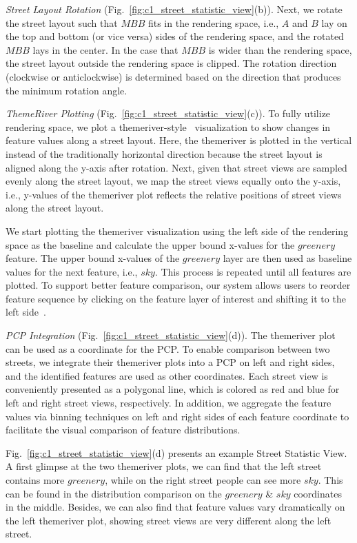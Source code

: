 \noindent
\textit{Street Layout Rotation} (Fig.~\ref{fig:c1_street_statistic_view}(b)).
Next, we rotate the street layout such that $MBB$ fits in the rendering space, i.e., $A$ and $B$ lay on the top and bottom (or vice versa) sides of the rendering space, and the rotated $MBB$ lays in the center.
In the case that $MBB$ is wider than the rendering space, the street layout outside the rendering space is clipped.
The rotation direction (clockwise or anticlockwise) is determined based on the direction that produces the minimum rotation angle.

\noindent
\textit{ThemeRiver Plotting} (Fig.~\ref{fig:c1_street_statistic_view}(c)).
To fully utilize rendering space, we plot a themeriver-style~\cite{havre2002themeriver} visualization to show changes in feature values along a street layout.
Here, the themeriver is plotted in the vertical instead of the traditionally horizontal direction because the street layout is aligned along the y-axis after rotation.
Next, given that street views are sampled evenly along the street layout, we map the street views equally onto the y-axis, i.e., y-values of the themeriver plot reflects the relative positions of street views along the street layout.

We start plotting the themeriver visualization using the left side of the rendering space as the baseline and calculate the upper bound x-values for the $greenery$ feature.
The upper bound x-values of the $greenery$ layer are then used as baseline values for the next feature, i.e., $sky$.
This process is repeated until all features are plotted.
To support better feature comparison, our system allows users to reorder feature sequence by clicking on the feature layer of interest and shifting it to the left side~\cite{byron2008stacked}.

\noindent
\textit{PCP Integration} (Fig.~\ref{fig:c1_street_statistic_view}(d)).
The themeriver plot can be used as a coordinate for the PCP.
To enable comparison between two streets, we integrate their themeriver plots into a PCP on left and right sides, and the identified features are used as other coordinates.
Each street view is conveniently presented as a polygonal line, which is colored as red and blue for left and right street views, respectively.
In addition, we aggregate the feature values via binning techniques on left and right sides of each feature coordinate to facilitate the visual comparison of feature distributions.

\vspace*{1mm}
Fig.~\ref{fig:c1_street_statistic_view}(d) presents an example Street Statistic View.
A first glimpse at the two themeriver plots, we can find that the left street contains more $greenery$, while on the right street people can see more $sky$.
This can be found in the distribution comparison on the $greenery$ \& $sky$ coordinates in the middle.
Besides, we can also find that feature values vary dramatically on the left themeriver plot, showing street views are very different along the left street.


